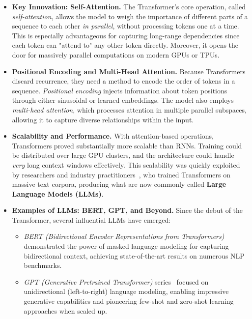 \begin{itemize}
    \item \textbf{Key Innovation: Self-Attention.} 
    The Transformer's core operation, called \textit{self-attention}, allows the model to weigh the importance of different parts of a sequence to each other \emph{in parallel}, without processing tokens one at a time. This is especially advantageous for capturing long-range dependencies since each token can "attend to" any other token directly. Moreover, it opens the door for massively parallel computations on modern GPUs or TPUs.

    \item \textbf{Positional Encoding and Multi-Head Attention.}
    Because Transformers discard recurrence, they need a method to encode the order of tokens in a sequence. \emph{Positional encoding} injects information about token positions through either sinusoidal or learned embeddings. The model also employs \textit{multi-head attention}, which processes attention in multiple parallel subspaces, allowing it to capture diverse relationships within the input.

    \item \textbf{Scalability and Performance.}
    With attention-based operations, Transformers proved substantially more scalable than RNNs. Training could be distributed over large GPU clusters, and the architecture could handle \emph{very} long context windows effectively. This scalability was quickly exploited by researchers and industry practitioners~\cite{brown2020language}, who trained Transformers on massive text corpora, producing what are now commonly called \textbf{Large Language Models (LLMs)}.

    \item \textbf{Examples of LLMs: BERT, GPT, and Beyond.}
    Since the debut of the Transformer, several influential LLMs have emerged:
    \begin{itemize}
        \item \textit{BERT (Bidirectional Encoder Representations from Transformers)}~\cite{devlin2018bert} demonstrated the power of masked language modeling for capturing bidirectional context, achieving state-of-the-art results on numerous NLP benchmarks.
        
        \item \textit{GPT (Generative Pretrained Transformer)} series~\cite{radford2018improving,radford2019language} focused on unidirectional (left-to-right) language modeling, enabling impressive generative capabilities and pioneering few-shot and zero-shot learning approaches when scaled up.
        

\end{itemize}
\end{itemize}
